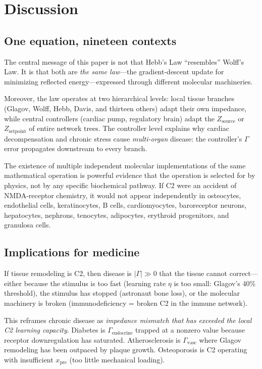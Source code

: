 \documentclass[aps,pre,twocolumn,superscriptaddress,floatfix]{revtex4-2}
\begin{document}
\section{Discussion}
\label{sec:discussion}

\subsection{One equation, nineteen contexts}

The central message of this paper is not that Hebb's Law
``resembles'' Wolff's Law.  It is that both are
\emph{the same law}---the gradient-descent update
for minimizing reflected energy---expressed through
different molecular machineries.

Moreover, the law operates at two hierarchical levels:
local tissue branches (Glagov, Wolff, Hebb, Davis,
and thirteen others)
adapt their own impedance, while central controllers
(cardiac pump, regulatory brain) adapt the
$Z_{\text{source}}$ or $Z_{\text{setpoint}}$ of
entire network trees.  The controller level explains
why cardiac decompensation and chronic stress cause
\emph{multi-organ} disease: the controller's
$\Gamma$ error propagates downstream to every branch.

The existence of multiple independent molecular
implementations of the same mathematical operation
is powerful evidence that the operation is selected
for by physics, not by any specific biochemical pathway.
If C2 were an accident of NMDA-receptor chemistry,
it would not appear independently in osteocytes,
endothelial cells, keratinocytes, B cells, cardiomyocytes,
baroreceptor neurons, hepatocytes, nephrons, tenocytes,
adipocytes, erythroid progenitors, and granulosa cells.

\subsection{Implications for medicine}

If tissue remodeling is C2, then disease is
$|\Gamma| \gg 0$ that the tissue cannot correct---either
because the stimulus is too fast (learning rate $\eta$
is too small: Glagov's 40\% threshold), the stimulus
has stopped (astronaut bone loss), or the molecular
machinery is broken (immunodeficiency = broken C2 in
the immune network).

This reframes chronic disease as \emph{impedance
mismatch that has exceeded the local C2 learning
capacity}.  Diabetes is $\Gamma_{\text{endocrine}}$
trapped at a nonzero value because receptor downregulation
has saturated.  Atherosclerosis is $\Gamma_{\text{vasc}}$
where Glagov remodeling has been outpaced by plaque growth.
Osteoporosis is C2 operating with insufficient
$x_{\text{pre}}$ (too little mechanical loading).
\end{document}
